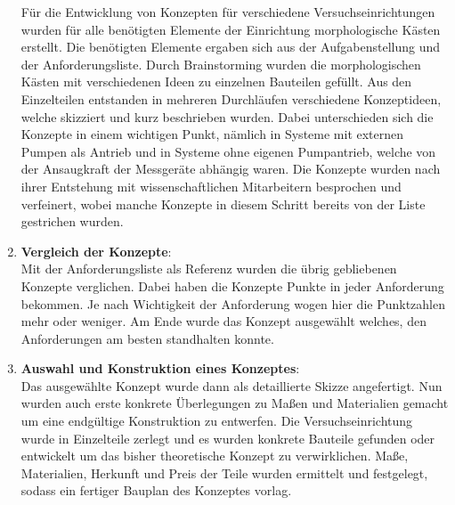 \begin{enumerate}
F\"{u}r die Entwicklung von Konzepten f\"{u}r verschiedene Versuchseinrichtungen wurden f\"{u}r alle ben\"{o}tigten Elemente der Einrichtung morphologische K\"{a}sten erstellt. Die ben\"{o}tigten Elemente ergaben sich aus der Aufgabenstellung und der Anforderungsliste. Durch Brainstorming wurden die morphologischen K\"{a}sten mit verschiedenen Ideen zu einzelnen Bauteilen gef\"{u}llt. Aus den Einzelteilen entstanden in mehreren Durchl\"{a}ufen verschiedene Konzeptideen, welche skizziert und kurz beschrieben wurden. Dabei unterschieden sich die Konzepte in einem wichtigen Punkt, n\"{a}mlich in Systeme mit externen Pumpen als Antrieb und in Systeme ohne eigenen Pumpantrieb, welche von der Ansaugkraft der Messger\"{a}te abh\"{a}ngig waren. Die Konzepte wurden nach ihrer Entstehung mit wissenschaftlichen Mitarbeitern besprochen und verfeinert, wobei manche Konzepte in diesem Schritt bereits von der Liste gestrichen wurden.
\item \textbf{Vergleich der Konzepte}:\\
Mit der Anforderungsliste als Referenz wurden die \"{u}brig gebliebenen Konzepte verglichen. Dabei haben die Konzepte Punkte in jeder Anforderung bekommen. Je nach Wichtigkeit der Anforderung wogen hier die Punktzahlen mehr oder weniger. Am Ende wurde das Konzept ausgew\"{a}hlt welches, den Anforderungen am besten standhalten konnte.
\item \textbf{Auswahl und Konstruktion eines Konzeptes}:\\
Das ausgew\"{a}hlte Konzept wurde dann als detaillierte Skizze angefertigt. Nun wurden auch erste konkrete \"{U}berlegungen zu Ma{\ss}en und Materialien gemacht um eine endg\"{u}ltige Konstruktion zu entwerfen. Die Versuchseinrichtung wurde in Einzelteile zerlegt und es wurden konkrete Bauteile gefunden oder entwickelt um das bisher theoretische Konzept zu verwirklichen. Ma{\ss}e, Materialien, Herkunft und Preis der Teile wurden ermittelt und festgelegt, sodass ein fertiger Bauplan des Konzeptes vorlag.
\end{enumerate}